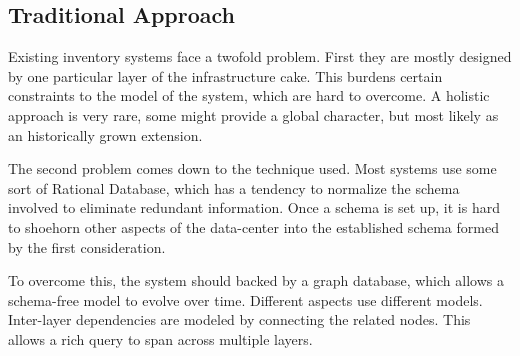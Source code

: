 \subsection{Traditional Approach}
Existing inventory systems face a twofold problem. First they are mostly designed by one particular layer of the infrastructure cake.
This burdens certain constraints to the model of the system, which are hard to overcome. A holistic approach is very rare, some might
provide a global character, but most likely as an historically grown extension.

The second problem comes down to the technique used. Most systems use some sort of Rational Database, which has a tendency to normalize
the schema involved to eliminate redundant information. Once a schema is set up, it is hard to shoehorn other aspects of the data-center into
the established schema formed by the first consideration.

To overcome this, the system should backed by a graph database, which allows a schema-free model to evolve over time. Different aspects
use different models. Inter-layer dependencies are modeled by connecting the related nodes. This allows a rich query to span across multiple layers.
